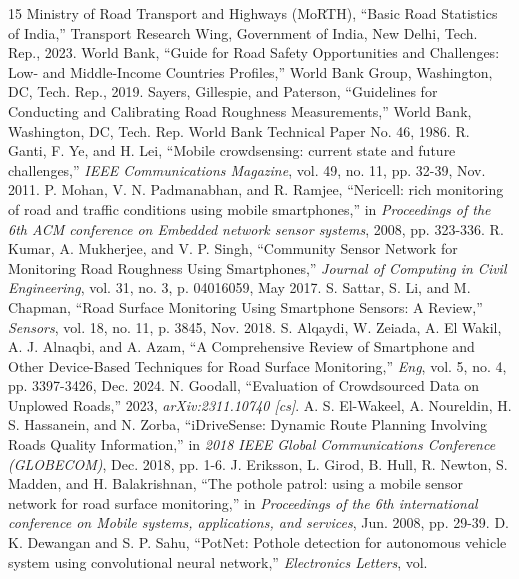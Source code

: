 \documentclass[conference]{IEEEtran}
\begin{document}
\begin{thebibliography}{15}
 Ministry of Road Transport and Highways (MoRTH), ``Basic Road Statistics of India,'' Transport Research Wing, Government of India, New Delhi, Tech.
Rep., 2023.
 World Bank, ``Guide for Road Safety Opportunities and Challenges: Low- and Middle-Income Countries Profiles,'' World Bank Group, Washington, DC, Tech.
Rep., 2019.
 Sayers, Gillespie, and Paterson, ``Guidelines for Conducting and Calibrating Road Roughness Measurements,'' World Bank, Washington, DC, Tech.
Rep. World Bank Technical Paper No. 46, 1986.
 R. Ganti, F. Ye, and H. Lei, ``Mobile crowdsensing: current state and future challenges,'' \textit{IEEE Communications Magazine}, vol.
49, no. 11, pp. 32-39, Nov. 2011.
 P. Mohan, V. N. Padmanabhan, and R. Ramjee, ``Nericell: rich monitoring of road and traffic conditions using mobile smartphones,'' in \textit{Proceedings of the 6th ACM conference on Embedded network sensor systems}, 2008, pp. 323-336.
 R. Kumar, A. Mukherjee, and V. P. Singh, ``Community Sensor Network for Monitoring Road Roughness Using Smartphones,'' \textit{Journal of Computing in Civil Engineering}, vol.
31, no. 3, p. 04016059, May 2017.
 S. Sattar, S. Li, and M. Chapman, ``Road Surface Monitoring Using Smartphone Sensors: A Review,'' \textit{Sensors}, vol.
18, no. 11, p. 3845, Nov. 2018.
 S. Alqaydi, W. Zeiada, A. El Wakil, A. J. Alnaqbi, and A. Azam, ``A Comprehensive Review of Smartphone and Other Device-Based Techniques for Road Surface Monitoring,'' \textit{Eng}, vol.
5, no. 4, pp. 3397-3426, Dec. 2024.
 N. Goodall, ``Evaluation of Crowdsourced Data on Unplowed Roads,'' 2023, \textit{arXiv:2311.10740 [cs]}.
 A. S. El-Wakeel, A. Noureldin, H. S. Hassanein, and N. Zorba, ``iDriveSense: Dynamic Route Planning Involving Roads Quality Information,'' in \textit{2018 IEEE Global Communications Conference (GLOBECOM)}, Dec. 2018, pp. 1-6.
 J. Eriksson, L. Girod, B. Hull, R. Newton, S. Madden, and H. Balakrishnan, ``The pothole patrol: using a mobile sensor network for road surface monitoring,'' in \textit{Proceedings of the 6th international conference on Mobile systems, applications, and services}, Jun. 2008, pp. 29-39.
 D. K. Dewangan and S. P. Sahu, ``PotNet: Pothole detection for autonomous vehicle system using convolutional neural network,'' \textit{Electronics Letters}, vol.

\end{thebibliography}
\end{document}
